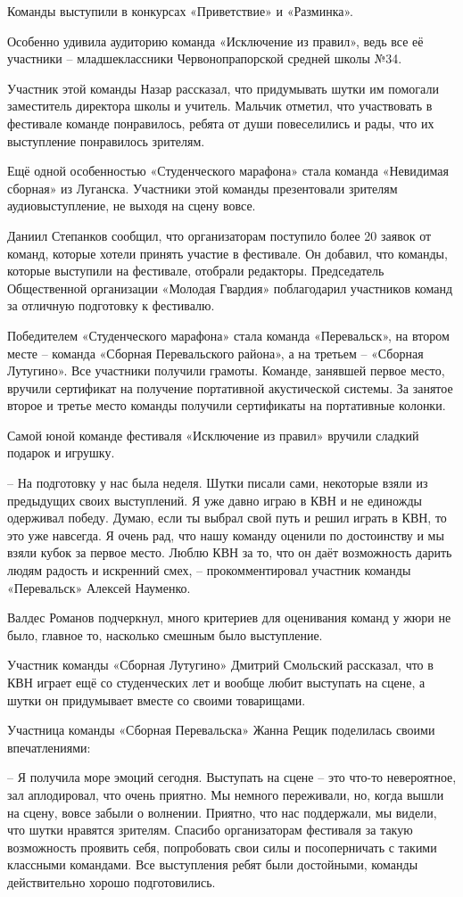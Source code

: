 
Команды выступили в конкурсах «Приветствие» и «Разминка».

Особенно удивила аудиторию команда «Исключение из правил», ведь все её
участники – младшеклассники Червонопрапорской средней школы №34.

Участник этой команды Назар рассказал, что придумывать шутки им помогали
заместитель директора школы и учитель. Мальчик отметил, что участвовать в
фестивале команде понравилось, ребята от души повеселились и рады, что их
выступление понравилось зрителям.

Ещё одной особенностью «Студенческого марафона» стала команда «Невидимая
сборная» из Луганска. Участники этой команды презентовали зрителям
аудиовыступление, не выходя на сцену вовсе.

Даниил Степанков сообщил, что организаторам поступило более 20 заявок от
команд, которые хотели принять участие в фестивале. Он добавил, что команды,
которые выступили на фестивале, отобрали редакторы. Председатель Общественной
организации «Молодая Гвардия» поблагодарил участников команд за отличную
подготовку к фестивалю.

Победителем «Студенческого марафона» стала команда «Перевальск», на втором
месте – команда «Сборная Перевальского района», а на третьем – «Сборная
Лутугино». Все участники получили грамоты. Команде, занявшей первое место,
вручили сертификат на получение портативной акустической системы. За занятое
второе и третье место команды получили сертификаты на портативные колонки.

Самой юной команде фестиваля «Исключение из правил» вручили сладкий подарок и
игрушку.

– На подготовку у нас была неделя. Шутки писали сами, некоторые взяли из
предыдущих своих выступлений. Я уже давно играю в КВН и не единожды одерживал
победу. Думаю, если ты выбрал свой путь и решил играть в КВН, то это уже
навсегда. Я очень рад, что нашу команду оценили по достоинству и мы взяли кубок
за первое место. Люблю КВН за то, что он даёт возможность дарить людям радость
и искренний смех, – прокомментировал участник команды «Перевальск» Алексей
Науменко.

Валдес Романов подчеркнул, много критериев для оценивания команд у жюри не
было, главное то, насколько смешным было выступление.

Участник команды «Сборная Лутугино» Дмитрий Смольский рассказал, что в КВН
играет ещё со студенческих лет и вообще любит выступать на сцене, а шутки он
придумывает вместе со своими товарищами.

Участница команды «Сборная Перевальска» Жанна Рещик поделилась своими
впечатлениями:

– Я получила море эмоций сегодня. Выступать на сцене – это что-то невероятное,
зал аплодировал, что очень приятно. Мы немного переживали, но, когда вышли на
сцену, вовсе забыли о волнении. Приятно, что нас поддержали, мы видели, что
шутки нравятся зрителям. Спасибо организаторам фестиваля за такую возможность
проявить себя, попробовать свои силы и посоперничать с такими классными
командами. Все выступления ребят были достойными, команды действительно хорошо
подготовились.
